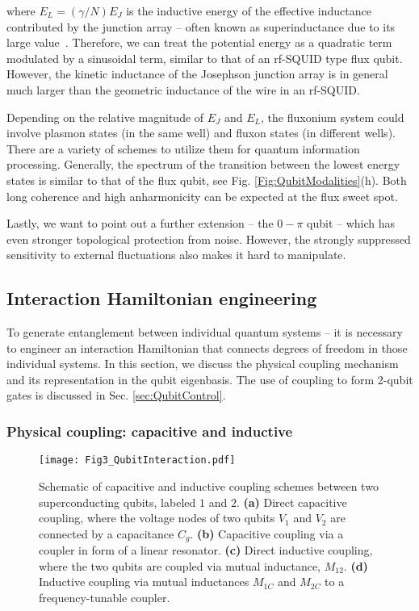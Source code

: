 \documentclass[aip,apr,twocolumn,showpacs,superscriptaddress,groupedaddress,nofootinbib,reprint]{revtex4-1}  %
\begin{document}
\noindent where $E_L = (\gamma/N)E_J$ is the inductive energy of the effective inductance contributed by the junction array -- often known as superinductance due to its large value~\cite{Manucharyan2009,Masluk2012,ManucharyanPhD2012}. Therefore, we can treat the potential energy as a quadratic term modulated by a sinusoidal term, similar to that of an rf-SQUID type flux qubit\cite{Friedman2002}. However, the kinetic inductance of the Josephson junction array is in general much larger than the geometric inductance of the wire in an rf-SQUID.

Depending on the relative magnitude of $E_J$ and $E_L$, the fluxonium system could involve plasmon states (in the same well) and fluxon states (in different wells). There are a variety of schemes to utilize them for quantum information processing. Generally, the spectrum of the transition between the lowest energy states is similar to that of the flux qubit, see Fig. \ref{Fig:QubitModalities}(h). Both long coherence and high anharmonicity can be expected at the flux sweet spot.

Lastly, we want to point out a further extension -- the $0-\pi$ qubit -- which has even stronger topological protection from noise\cite{Kerman2010,Groszkowski2018}. However, the strongly suppressed sensitivity to external fluctuations also makes it hard to manipulate.

\subsection{\label{sec:interactionHengineering}Interaction Hamiltonian engineering}

To generate entanglement between individual quantum systems -- it is necessary to engineer an interaction Hamiltonian that connects degrees of freedom in those individual systems. In this section, we discuss the physical coupling mechanism and its representation in the qubit eigenbasis. The use of coupling to form 2-qubit gates is discussed in Sec. \ref{sec:QubitControl}.

\subsubsection{Physical coupling: capacitive and inductive}

\begin{figure}[htp]
\begin{center}
\texttt{[image: Fig3\_QubitInteraction.pdf]}
\caption{Schematic of capacitive and inductive coupling schemes between two superconducting qubits, labeled $1$ and $2$. \textbf{(a)} Direct capacitive coupling, where the voltage nodes of two qubits $V_1$ and $V_2$ are connected by a capacitance $C_g$. \textbf{(b)} Capacitive coupling via a coupler in form of a linear resonator. \textbf{(c)} Direct inductive coupling, where the two qubits are coupled via mutual inductance, $M_{12}$. \textbf{(d)} Inductive coupling via mutual inductances $M_{1C}$ and $M_{2C}$ to a frequency-tunable coupler.}
\label{Fig:QubitInteraction}
\end{center}
\end{figure}
\end{document}
